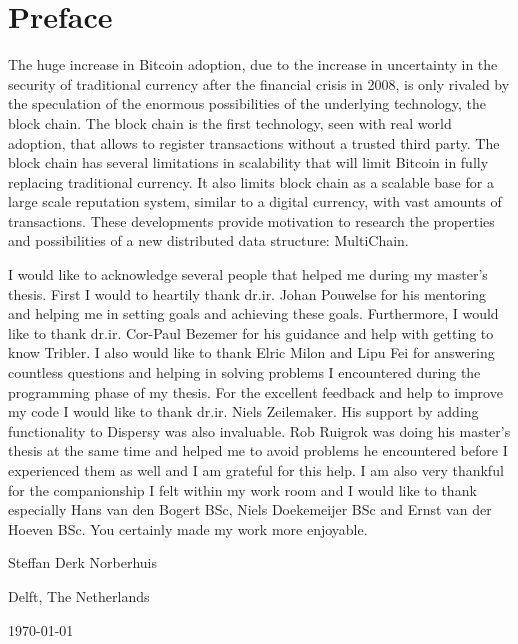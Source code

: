 \chapter*{Preface}
The huge increase in Bitcoin adoption, 
due to the increase in uncertainty in the security of traditional currency 
after the financial crisis in 2008, 
is only rivaled by the speculation of the enormous possibilities 
of the underlying technology, the block chain.
The block chain is the first technology, seen with real world adoption,
that allows to register transactions without a trusted third party.
The block chain has several limitations in scalability
that will limit Bitcoin in fully replacing traditional currency.
It also limits block chain as a scalable base for a large scale reputation system,
similar to a digital currency, with vast amounts of transactions.
These developments provide motivation to research the properties and possibilities of a new distributed data structure:
MultiChain.

\vspace{1\baselineskip}

\noindent
I would like to acknowledge several people that helped me during my master's thesis.
First I would to heartily thank dr.ir. Johan Pouwelse for his mentoring and
helping me in setting goals and achieving these goals.
Furthermore, I would like to thank dr.ir. Cor-Paul Bezemer for his guidance and help with getting to know Tribler.
I also would like to thank Elric Milon and Lipu Fei for answering countless questions
and helping in solving problems I encountered during the programming phase of my thesis.
For the excellent feedback and help to improve my code I would like to thank dr.ir. Niels Zeilemaker.
His support by adding functionality to Dispersy was also invaluable.
Rob Ruigrok was doing his master's thesis at the same time
and helped me to avoid problems he encountered before I experienced them as well and
I am grateful for this help.
I am also very thankful for the companionship I felt within my work room 
and I would like to thank especially Hans van den Bogert BSc, Niels Doekemeijer BSc and Ernst van der Hoeven BSc.
You certainly made my work more enjoyable.

\vspace{1\baselineskip}

\noindent
Steffan Derk Norberhuis

\vspace{1\baselineskip}

\noindent
Delft, The Netherlands

\noindent
\today
